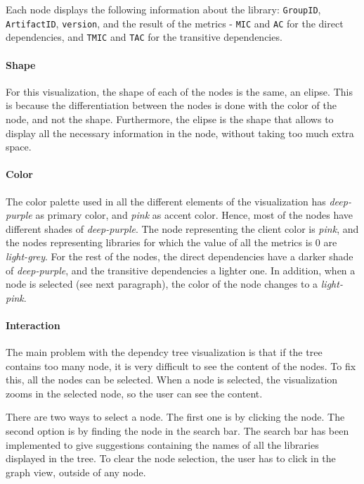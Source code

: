 Each node displays the following information about the library: \texttt{GroupID}, \texttt{ArtifactID}, \texttt{version}, and the result of the metrics - \texttt{MIC} and \texttt{AC} for the direct dependencies, and \texttt{TMIC} and \texttt{TAC} for the transitive dependencies.

\paragraph{Shape}
For this visualization, the shape of each of the nodes is the same, an elipse. This is because the differentiation between the nodes is done with the color of the node, and not the shape. Furthermore, the elipse is the shape that allows to display all the necessary information in the node, without taking too much extra space.

\paragraph{Color}
The color palette used in all the different elements of the visualization has \textit{deep-purple} as primary color, and \textit{pink} as accent color. Hence, most of the nodes have different shades of \textit{deep-purple}. The node representing the client color is \textit{pink}, and the nodes representing libraries for which the value of all the metrics is 0 are \textit{light-grey}. For the rest of the nodes, the direct dependencies have a darker shade of \textit{deep-purple}, and the transitive dependencies a lighter one. 
In addition, when a node is selected (see next paragraph), the color of the node changes to a \textit{light-pink}.

\paragraph{Interaction}
The main problem with the dependcy tree visualization is that if the tree contains too many node, it is very difficult to see the content of the nodes. To fix this, all the nodes can be selected. When a node is selected, the visualization zooms in the selected node, so the user can see the content.

There are two ways to select a node. The first one is by clicking the node. The second option is by finding the node in the search bar. The search bar has been implemented to give suggestions containing the names of all the libraries displayed in the tree. To clear the node selection, the user has to click in the graph view, outside of any node.


